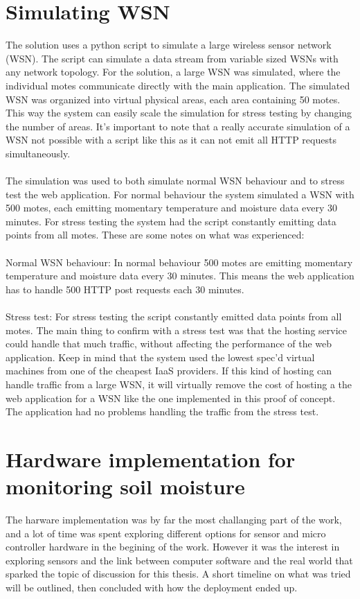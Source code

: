 \documentclass[]{uiophd}
\begin{document}
\section{Simulating WSN}
The solution uses a python script to simulate a large wireless sensor network (WSN). The script can simulate a data stream from variable sized WSNs with any network topology. For the solution, a large WSN was simulated, where the individual motes communicate directly with the main application. The simulated WSN was organized into virtual physical areas, each area containing 50 motes. This way the system can easily scale the simulation for stress testing by changing the number of areas. It’s important to note that a really accurate simulation of a WSN not possible with a script like this as it can not emit all HTTP requests simultaneously.
\\\\
The simulation was used to both simulate normal WSN behaviour and to stress test the web application. For normal behaviour the system simulated a WSN with 500 motes, each emitting momentary temperature and moisture data every 30 minutes. For stress testing the system had the script constantly emitting data points from all motes. These are some notes on what was experienced:
\\\\
Normal WSN behaviour: In normal behaviour 500 motes are emitting momentary temperature and moisture data every 30 minutes. This means the web application has to handle 500 HTTP post requests each 30 minutes.
\\\\
Stress test:  For stress testing the script constantly emitted data points from all motes. The main thing to confirm with a stress test was that the hosting service could handle that much traffic, without affecting the performance of the web application. Keep in mind that the system used the lowest spec’d virtual machines from one of the cheapest IaaS providers. If this kind of hosting can handle traffic from a large WSN, it will virtually remove the cost of hosting a the web application for a WSN like the one implemented in this proof of concept. The application had no problems handling the traffic from the stress test.

  
\section{Hardware implementation for monitoring soil moisture}
The harware implementation was by far the most challanging part of the work, and a lot of time was spent exploring different options for sensor and micro controller hardware in the begining of the work. However it was the interest in exploring sensors and the link between computer software and the real world that sparked the topic of discussion for this thesis. A short timeline on what was tried will be outlined, then concluded with how the deployment ended up.
\end{document}
